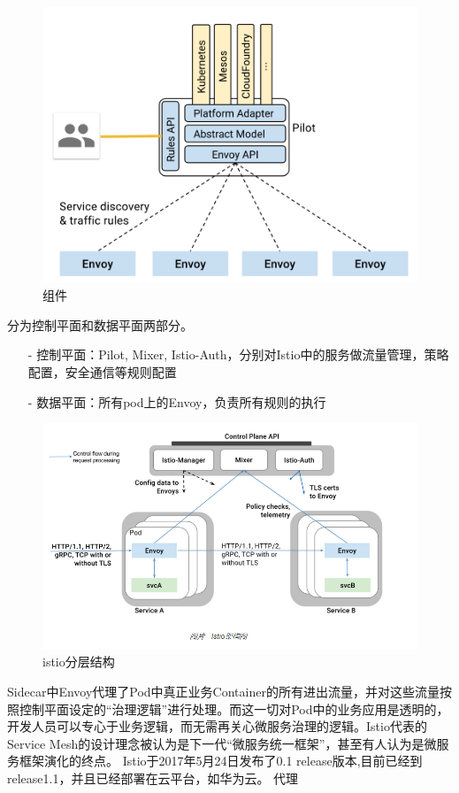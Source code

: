 \documentclass{ctexart}
\begin{document}
\begin{figure}[H]
\includegraphics[scale=0.4]{istio/istion_component.png}
\caption{组件}
\end{figure}


分为控制平面和数据平面两部分。 
\begin{enumerate}
	\item [-] 控制平面：Pilot, Mixer, Istio-Auth，分别对Istio中的服务做流量管理，策略配置，安全通信等规则配置 
	\item [-] 数据平面：所有pod上的Envoy，负责所有规则的执行
\end{enumerate}
\begin{figure}[H]
	\includegraphics[scale=0.5]{istio/framework2.png}
	\caption{istio分层结构}
\end{figure}
Sidecar中Envoy代理了Pod中真正业务Container的所有进出流量，并对这些流量按照控制平面设定的“治理逻辑”进行处理。而这一切对Pod中的业务应用是透明的，开发人员可以专心于业务逻辑，而无需再关心微服务治理的逻辑。Istio代表的Service Mesh的设计理念被认为是下一代“微服务统一框架”，甚至有人认为是微服务框架演化的终点。
Istio于2017年5月24日发布了0.1 release版本,目前已经到release1.1，并且已经部署在云平台，如华为云。
代理
\end{document}
